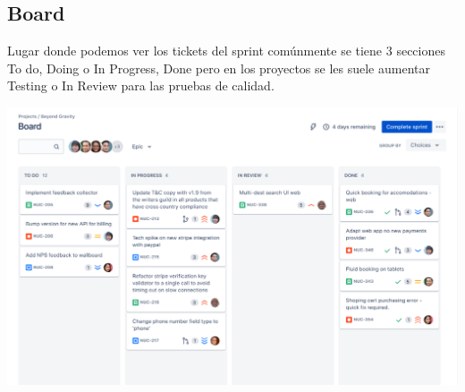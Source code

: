 \subsection{Board}
Lugar donde podemos ver los tickets del sprint comúnmente se tiene 3 secciones To do, Doing o In Progress, Done pero en los proyectos se les suele aumentar Testing  o In Review para las pruebas de calidad.
\begin{center}
	\includegraphics[width=1\textwidth]{image/scrum-board.png}
\end{center}







